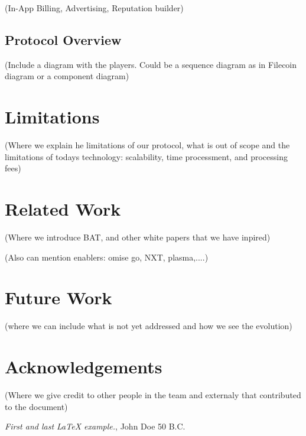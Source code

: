\documentclass[12pt, a4paper, twoside, titlepage]{article}
\begin{document}
(In-App Billing, Advertising, Reputation builder) 

\subsection{Protocol Overview}

(Include a diagram with the players. Could be a sequence diagram as in Filecoin diagram or a component diagram)



\section{Limitations}

(Where we explain he limitations of our protocol, what is out of scope and the limitations of todays technology: scalability, time processment, and processing fees)

\section{Related Work}

(Where we introduce BAT, and other white papers that we have inpired)

(Also can mention enablers: omise go, NXT, plasma,....)

\section{Future Work}

(where we can include what is not yet addressed and how we see the evolution)

\section{Acknowledgements}

(Where we give credit to other people in the team and externaly that contributed to the document)

\begin{thebibliography}{9}
 \emph{First and last \LaTeX{} example.},
John Doe 50 B.C. 
\end{thebibliography}
\end{document}
